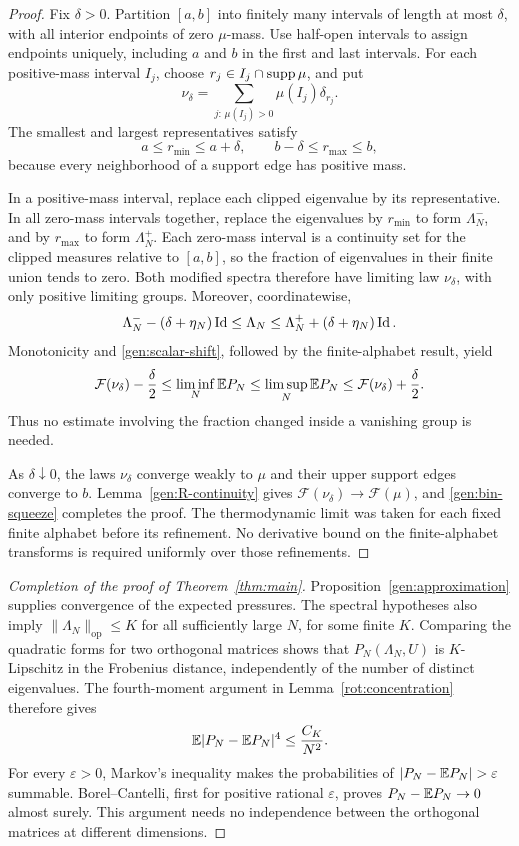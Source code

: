 \begin{proof}
Fix $\delta>0$.  Partition $[a,b]$ into finitely many intervals of
length at most $\delta$, with all interior endpoints of zero
$\mu$-mass.  Use half-open intervals to assign endpoints uniquely,
including $a$ and $b$ in the first and last intervals.  For each
positive-mass interval $I_j$, choose
$r_j\in I_j\cap\operatorname{supp}\mu$, and put
\[
 \nu_\delta=\sum_{j:\,\mu(I_j)>0}\mu(I_j)\delta_{r_j}.
\]
The smallest and largest representatives satisfy
\[
 a\le r_{\min}\le a+\delta,
 \qquad b-\delta\le r_{\max}\le b,
\]
because every neighborhood of a support edge has positive mass.

In a positive-mass interval, replace each clipped eigenvalue by its
representative.  In all zero-mass intervals together, replace the
eigenvalues by $r_{\min}$ to form $\Lambda_N^-$, and by
$r_{\max}$ to form $\Lambda_N^+$.  Each zero-mass interval is a
continuity set for the clipped measures relative to $[a,b]$, so the
fraction of eigenvalues in their finite union tends to zero.  Both
modified spectra therefore have limiting law $\nu_\delta$, with
only positive limiting groups.  Moreover, coordinatewise,
\[
 \Lambda_N^--(\delta+\eta_N)\operatorname{Id}
 \le\Lambda_N\le
 \Lambda_N^++(\delta+\eta_N)\operatorname{Id}.
\]
Monotonicity and \eqref{gen:scalar-shift}, followed by the
finite-alphabet result, yield
\begin{equation}\label{gen:bin-squeeze}
 \mathcal F(\nu_\delta)-\frac\delta2
 \le\liminf_N\mathbb E P_N
 \le\limsup_N\mathbb E P_N
 \le\mathcal F(\nu_\delta)+\frac\delta2.
\end{equation}
Thus no estimate involving the fraction changed inside a vanishing
group is needed.

As $\delta\downarrow0$, the laws $\nu_\delta$ converge weakly to
$\mu$ and their upper support edges converge to $b$.
Lemma~\ref{gen:R-continuity} gives
$\mathcal F(\nu_\delta)\to\mathcal F(\mu)$, and
\eqref{gen:bin-squeeze} completes the proof.  The thermodynamic limit
was taken for each fixed finite alphabet before its refinement.
No derivative bound on the finite-alphabet transforms is required
uniformly over those refinements.
\end{proof}

\begin{proof}[Completion of the proof of Theorem~\ref{thm:main}]
Proposition~\ref{gen:approximation} supplies convergence of the
expected pressures.  The spectral hypotheses also imply
$\|\Lambda_N\|_{\mathrm{op}}\le K$ for all sufficiently large $N$,
for some finite $K$.  Comparing the quadratic forms for two orthogonal
matrices shows that $P_N(\Lambda_N,U)$ is $K$-Lipschitz in the
Frobenius distance, independently of the number of distinct
eigenvalues.  The fourth-moment argument in
Lemma~\ref{rot:concentration} therefore gives
\[
 \mathbb E|P_N-\mathbb E P_N|^4\le \frac{C_K}{N^2}.
\]
For every $\varepsilon>0$, Markov's inequality makes the probabilities
of $|P_N-\E P_N|>\varepsilon$ summable.  Borel--Cantelli, first for
positive rational $\varepsilon$, proves $P_N-\mathbb E P_N\to0$ almost
surely.  This argument needs no independence between the orthogonal
matrices at different dimensions.
\end{proof}

